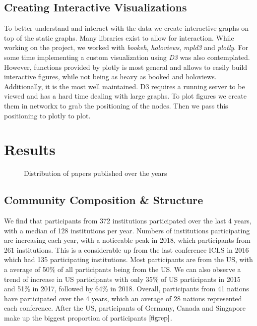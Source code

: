 \documentclass[journal,twocolumn]{IEEEtran}
\begin{document}
    \hypertarget{creating-interactive-visualizations}{%
\subsection{Creating Interactive
Visualizations}\label{creating-interactive-visualizations}}

To better understand and interact with the data we create interactive
graphs on top of the static graphs. Many libraries exist to allow for
interaction. While working on the project, we worked with \emph{bookeh},
\emph{holoviews}, \emph{mpld3} and \emph{plotly}. For some time
implementing a custom visualization using \emph{D3} was also
contemplated. However, functions provided by plotly is most general and
allows to easily build interactive figures, while not being as heavy as
booked and holoviews. Additionally, it is the most well maintained. D3
requires a running server to be viewed and has a hard time dealing with
large graphs. To plot figures we create them in networkx to grab the
positioning of the nodes. Then we pass this positioning to plotly to
plot.

    \hypertarget{results}{%
\section{Results}\label{results}}


    \begin{figure}
        \begin{center}\end{center}
        \caption{Distribution of papers published over the years}
        \label{fig1}
    \end{figure}
    
    \hypertarget{community-composition-structure}{%
\subsection{Community Composition \&
Structure}\label{community-composition-structure}}

We find that participants from 372 institutions participated over the
last 4 years, with a median of 128 institutions per year. Numbers of
institutions participating are increasing each year, with a noticeable
peak in 2018, which participants from 261 institutions. This is a
considerable up from the last conference ICLS in 2016 which had 135
participating institutions. Most participants are from the US, with a
average of 50\% of all participants being from the US. We can also
observe a trend of increase in US participants with only 35\% of US
participants in 2015 and 51\% in 2017, followed by 64\% in 2018.
Overall, participants from 41 nations have participated over the 4
years, which an average of 28 nations represented each conference. After
the US, participants of Germany, Canada and Singapore make up the
biggest proportion of participants \(\ref{figrep}\).
\end{document}
